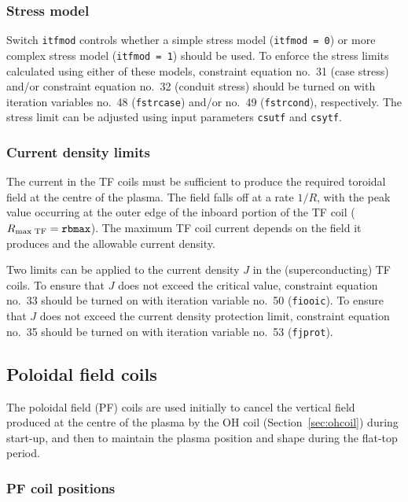 \documentclass[11pt,a4paper]{report}
\begin{document}
\subsubsection{Stress model}

Switch \texttt{itfmod} controls whether a simple stress model (\texttt{itfmod
  = 0}) or more complex stress model (\texttt{itfmod = 1}) should be used. To
enforce the stress limits calculated using either of these models, constraint
equation no.\ 31 (case stress) and/or constraint equation no.\ 32 (conduit
stress) should be turned on with iteration variables no.\ 48
(\texttt{fstrcase}) and/or no.\ 49 (\texttt{fstrcond}), respectively. The
stress limit can be adjusted using input parameters \texttt{csutf} and
\texttt{csytf}.

\subsubsection{Current density limits}

The current in the TF coils must be sufficient to produce the required
toroidal field at the centre of the plasma. The field falls off at a rate
$1/R$, with the peak value occurring at the outer edge of the inboard portion
of the TF coil ($R_{\mbox{\scriptsize max TF}} = \mathtt{rbmax}$). The maximum
TF coil current depends on the field it produces and the allowable current
density.

Two limits can be applied to the current density $J$ in the (superconducting)
TF coils. To ensure that $J$ does not exceed the critical value, constraint
equation no.\ 33 should be turned on with iteration variable no.\ 50
(\texttt{fiooic}). To ensure that $J$ does not exceed the current density
protection limit, constraint equation no.\ 35 should be turned on with
iteration variable no.\ 53 (\texttt{fjprot}).

\subsection{Poloidal field coils}
\label{sec:pfcoils}

The poloidal field (PF) coils are used initially to cancel the vertical field
produced at the centre of the plasma by the OH coil (Section~\ref{sec:ohcoil})
during start-up, and then to maintain the plasma position and shape during the
flat-top period.

\subsubsection{PF coil positions}
\end{document}
